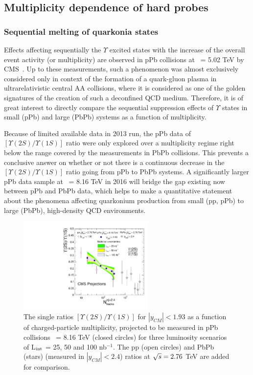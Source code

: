 \subsection{Multiplicity dependence of hard probes}

\subsubsection{Sequential melting of quarkonia states}

Effects affecting sequentially the $\Upsilon$ excited states with the increase 
of the overall event activity (or multiplicity) are observed in pPb collisions 
at \roots\ = 5.02 TeV by CMS~\cite{Chatrchyan:2013nza}. Up to these measurements, 
such a phenomenon was almost exclusively considered only in context of the formation 
of a quark-gluon plasma in ultrarelativistic central AA collisions, 
where it is considered as one of the golden signatures of the creation of 
such a deconfined QCD medium. Therefore, it is of great interest to directly
compare the sequential suppression effects of $\Upsilon$ states in small (pPb) and
large (PbPb) systems as a function of multiplicity.

Because of limited available data in 2013 run, the pPb data of 
$[\Upsilon(2S) / \Upsilon(1S)]$ ratio were only explored over a multiplicity 
regime right below the range covered by the measurements in PbPb collisions.
This prevents a conclusive answer on whether or not there is a continuous decrease
in the $[\Upsilon(2S) / \Upsilon(1S)]$ ratio going from pPb to PbPb systems.
A significantly larger pPb data sample at \rootsNN\ = 8.16 TeV 
in 2016 will bridge the gap existing now between pPb and PbPb data, which 
helps to make a quantitative statement about the phenomena affecting 
quarkonium production from small (pp, pPb) to large (PbPb), high-density QCD environments. 


\begin{figure}[thb]
  \begin{center}
    \includegraphics[width=0.6\textwidth]{figures/Upsilon_pPb_proj_combineLumi.pdf}
    \caption{ The single ratios $[\Upsilon(2S) / \Upsilon(1S)]$ for $|y_{CM}|<1.93$ 
    as a function of charged-particle multiplicity, projected to be measured in pPb collisions 
    \rootsNN\ = 8.16 TeV (closed circles) for three luminosity scenarios of L$_{\rm int}$ = 
    25, 50 and 100 nb$^{-1}$. The pp (open circles) and PbPb (stars) (measured in $|y_{CM}|<2.4$) 
    ratios at $\sqrt{s} = 2.76$ TeV are added for comparison.
    }
    \label{fig:UpsilonvsNtrk}
  \end{center}
\end{figure} 

